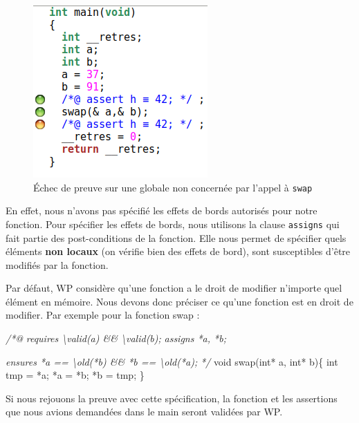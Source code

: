 \documentclass[12pt,francais,]{scrbook}
\newenvironment{Shaded}{}{}
\newcommand{\DataTypeTok}[1]{\textcolor[rgb]{0.56,0.13,0.00}{{#1}}}
\newcommand{\CommentTok}[1]{\textcolor[rgb]{0.38,0.63,0.69}{\textit{{#1}}}}
\newcommand{\NormalTok}[1]{{#1}}
\begin{document}
\begin{figure}[htbp]
\centering
\includegraphics[scale=0.5]{2-2-2-swap-1.png}
\caption{Échec de preuve sur une globale non concernée par l'appel à
\texttt{swap}}
\label{fig:2-2-2-swap-1}
\end{figure}

En effet, nous n'avons pas spécifié les effets de bords autorisés pour
notre fonction. Pour spécifier les effets de bords, nous utilisons la
clause \texttt{assigns} qui fait partie des post-conditions de la
fonction. Elle nous permet de spécifier quels éléments \textbf{non
locaux} (on vérifie bien des effets de bord), sont susceptibles d'être
modifiés par la fonction.

Par défaut, WP considère qu'une fonction a le droit de modifier
n'importe quel élément en mémoire. Nous devons donc préciser ce qu'une
fonction est en droit de modifier. Par exemple pour la fonction swap :

\begin{footnotesize}\begin{Shaded}
\begin{Highlighting}[]
\CommentTok{/*@}
\CommentTok{  requires \textbackslash{}valid(a) && \textbackslash{}valid(b);}
\CommentTok{ }
\CommentTok{  assigns *a, *b;}

\CommentTok{  ensures  *a == \textbackslash{}old(*b) && *b == \textbackslash{}old(*a);}
\CommentTok{*/}
\DataTypeTok{void} \NormalTok{swap(}\DataTypeTok{int}\NormalTok{* a, }\DataTypeTok{int}\NormalTok{* b)\{}
  \DataTypeTok{int} \NormalTok{tmp = *a;}
  \NormalTok{*a = *b;}
  \NormalTok{*b = tmp;}
\NormalTok{\}}
\end{Highlighting}
\end{Shaded}\end{footnotesize}

Si nous rejouons la preuve avec cette spécification, la fonction et les
assertions que nous avions demandées dans le main seront validées par
WP.
\end{document}
